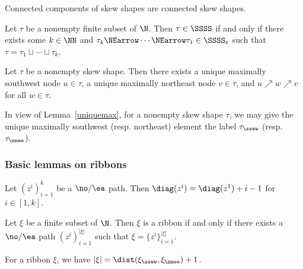 \begin{lemma}\label{skewcomps}
Connected components of skew shapes are connected skew shapes.
\end{lemma}



\begin{lemma}\label{skewshapecondecomp}
Let \(\tau\) be a nonempty finite subset of \(\N\). Then \(\tau \in \SSSS\) if and only if there exists some \(k \in \NN\) and \(\tau_k \NEarrow \cdots \NEarrow \tau_1 \in \SSSS_{\tt c}\) such that \(\tau = \tau_1 \sqcup \cdots \sqcup \tau_k\).
\end{lemma}


\begin{lemma}\label{uniquemax}
Let \(\tau\) be a nonempty skew shape. Then there exists a unique maximally southwest node \(u \in \tau\), a unique maximally northeast node \(v \in \tau\), and \(u \nearrow w \nearrow v\) for all \(w \in \tau\).
\end{lemma}

In view of Lemma~\ref{uniquemax}, for a nonempty skew shape \(\tau\), we may give the unique maximally southwest (resp. northeast) element the label \(\tau_{\ssww}\) (resp. \(\tau_{\nnee}\)). 

\subsubsection{Basic lemmas on ribbons}

\begin{lemma}\label{dumbdiag}
Let \((z^i)_{i = 1}^k\) be a \(\no/\ea\) path. Then \(\diag(z^i) = \diag(z^1) + i -1\) for \(i \in [1,k]\).
\end{lemma}

\begin{lemma}\label{hookispath}
Let \(\xi\) be a finite subset of \(\N\). Then \(\xi\) is a ribbon if and only if there exists a \(\no/\ea\) path  \((z^i)_{i = 1}^{|\xi|}\) such that \(\xi = \{z^i\}_{i = 1}^{|\xi|}\).
\end{lemma}

\begin{lemma}\label{sizehook}
For a ribbon \(\xi\), we have \(|\xi| = \dist(\xi_{\ssww}, \xi_{\nnee})+1\).
\end{lemma}


